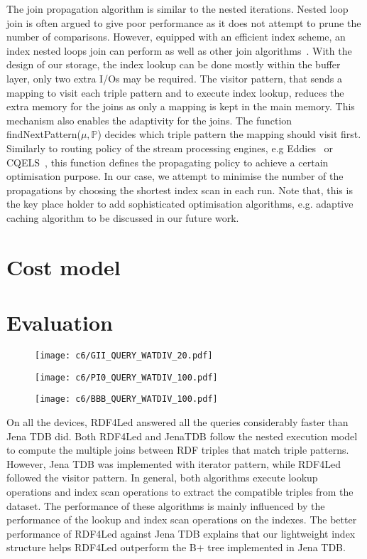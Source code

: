 The join propagation algorithm is similar to the nested iterations. Nested loop join is often argued to give poor performance as it does not attempt to prune the number of comparisons. However, equipped with an efficient index scheme, an index nested loops join can perform as well as other join algorithms~\cite{Graefe:2003}.
With the design of our storage, the index lookup can be done mostly within the buffer layer, only two extra I/Os may be required. The visitor pattern, that sends a mapping to visit each triple pattern and to execute index lookup, reduces the extra memory for the joins as only a mapping is kept in the main memory. This mechanism also enables the adaptivity for the joins. The function findNextPattern($\mu, \mathbb{P}$) decides which triple pattern the mapping should visit first. Similarly to routing policy of the stream processing engines, e.g Eddies~\cite{Avnur:2000} or CQELS~\cite{Danh:2011}, this function defines the propagating policy to achieve a certain optimisation purpose. In our case, we attempt to minimise the number of the propagations by choosing the shortest index scan in each run. Note that, this is the key place holder to add sophisticated optimisation algorithms, e.g. adaptive caching algorithm to be discussed in our future work.  

\section{Cost model}

\section{Evaluation}


\begin{figure}[ht!]
\centering
\texttt{[image: c6/GII\_QUERY\_WATDIV\_20.pdf]}
\label{fig:result_query}
\end{figure}

\begin{figure}[ht!]
\centering
\texttt{[image: c6/PI0\_QUERY\_WATDIV\_100.pdf]}
\label{fig:result_query}
\end{figure}

\begin{figure}[ht!]
\centering
\texttt{[image: c6/BBB\_QUERY\_WATDIV\_100.pdf]}
\label{fig:result_query}
\end{figure}

On all the devices, RDF4Led answered all the queries considerably faster than Jena TDB did. Both RDF4Led and JenaTDB follow the nested execution model to compute the multiple joins between RDF triples that match triple patterns. However, Jena TDB was implemented with iterator pattern, while RDF4Led followed the visitor pattern. In general, both algorithms execute lookup operations and index scan operations to extract the compatible triples from the dataset. The performance of these algorithms is mainly influenced by the performance of the lookup and index scan operations on the indexes. The better performance of RDF4Led against Jena TDB explains that our lightweight index structure helps RDF4Led outperform the B$+$ tree implemented in Jena TDB.  


